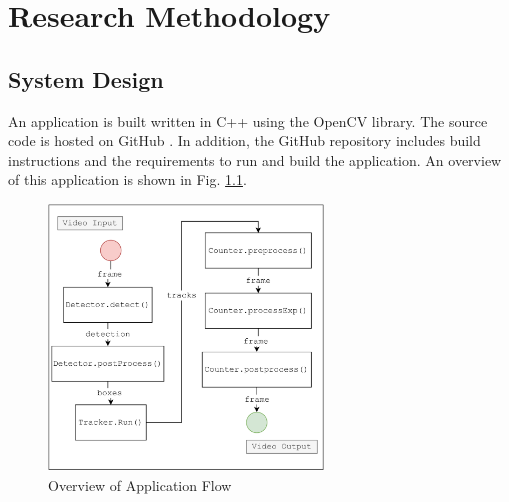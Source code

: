 \documentclass[12pt,a4paper,fleqn]{report}
\begin{document}
\clearpage

\chapter{Research Methodology}

\section{System Design}
An application is built written in C++ using the OpenCV library.
The source code is hosted on GitHub \cite{rvc-source:2022}.
In addition, the GitHub repository includes build instructions and the requirements to run and build the
application.
An overview of this application is shown in Fig. \ref{fig:systemflow}.

\begin{figure}[htbp]
    \begin{center}
        \includegraphics[width=0.65\textwidth]{figures/systemflow.png}
    \end{center}
    \caption{Overview of Application Flow}
    \label{fig:systemflow}
\end{figure}
\end{document}
